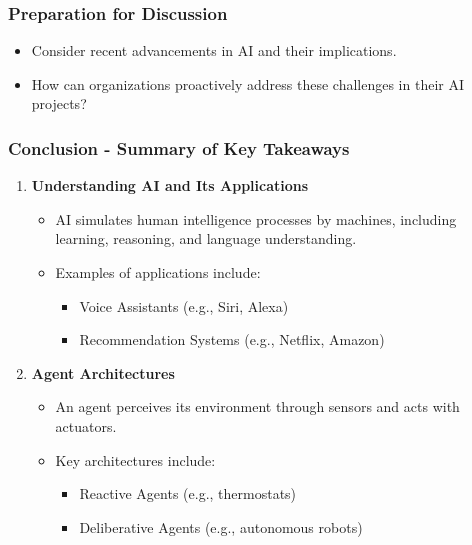 \documentclass[aspectratio=169]{beamer}
\begin{document}
\begin{frame}[fragile]
    \frametitle{Preparation for Discussion}
    \begin{itemize}
        \item Consider recent advancements in AI and their implications.
        \item How can organizations proactively address these challenges in their AI projects?
    \end{itemize}
\end{frame}

\begin{frame}[fragile]
    \frametitle{Conclusion - Summary of Key Takeaways}
    \begin{enumerate}
        \item \textbf{Understanding AI and Its Applications}
        \begin{itemize}
            \item AI simulates human intelligence processes by machines, including learning, reasoning, and language understanding.
            \item Examples of applications include:
            \begin{itemize}
                \item Voice Assistants (e.g., Siri, Alexa)
                \item Recommendation Systems (e.g., Netflix, Amazon)
            \end{itemize}
        \end{itemize}

        \item \textbf{Agent Architectures}
        \begin{itemize}
            \item An agent perceives its environment through sensors and acts with actuators.
            \item Key architectures include:
            \begin{itemize}
                \item Reactive Agents (e.g., thermostats)
                \item Deliberative Agents (e.g., autonomous robots)
            \end{itemize}
        \end{itemize}
    \end{enumerate}
\end{frame}
\end{document}
